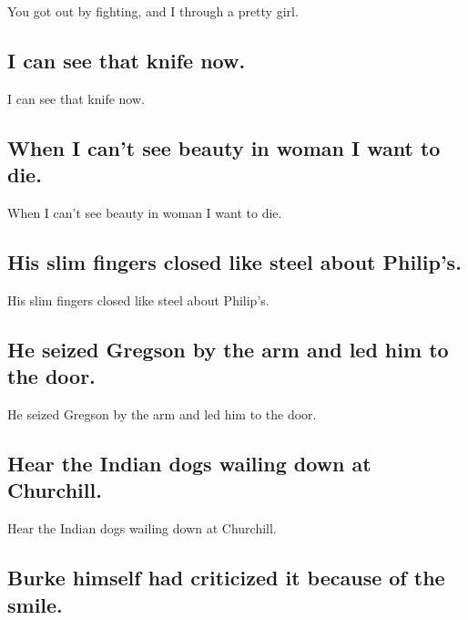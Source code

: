 \documentclass[]{article}
\begin{document}
You got out by fighting, and I through a pretty girl.

\hypertarget{i-can-see-that-knife-now.}{%
\subsection{I can see that knife now.}\label{i-can-see-that-knife-now.}}

I can see that knife now.

\hypertarget{when-i-cant-see-beauty-in-woman-i-want-to-die.}{%
\subsection{When I can't see beauty in woman I want to
die.}\label{when-i-cant-see-beauty-in-woman-i-want-to-die.}}

When I can't see beauty in woman I want to die.

\hypertarget{his-slim-fingers-closed-like-steel-about-philips.}{%
\subsection{His slim fingers closed like steel about
Philip's.}\label{his-slim-fingers-closed-like-steel-about-philips.}}

His slim fingers closed like steel about Philip's.

\hypertarget{he-seized-gregson-by-the-arm-and-led-him-to-the-door.}{%
\subsection{He seized Gregson by the arm and led him to the
door.}\label{he-seized-gregson-by-the-arm-and-led-him-to-the-door.}}

He seized Gregson by the arm and led him to the door.

\hypertarget{hear-the-indian-dogs-wailing-down-at-churchill.}{%
\subsection{Hear the Indian dogs wailing down at
Churchill.}\label{hear-the-indian-dogs-wailing-down-at-churchill.}}

Hear the Indian dogs wailing down at Churchill.

\hypertarget{burke-himself-had-criticized-it-because-of-the-smile.}{%
\subsection{Burke himself had criticized it because of the
smile.}\label{burke-himself-had-criticized-it-because-of-the-smile.}}
\end{document}
